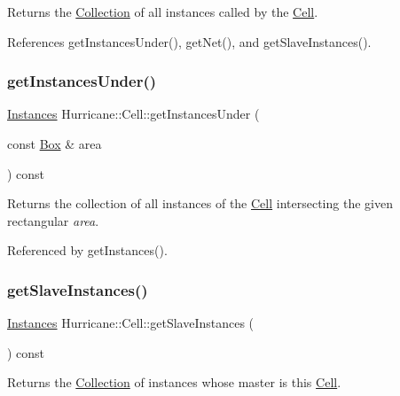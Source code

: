 Returns the \hyperlink{classHurricane_1_1Collection}{Collection} of all instances called by the \hyperlink{classHurricane_1_1Cell}{Cell}. 

References get\+Instances\+Under(), get\+Net(), and get\+Slave\+Instances().

\mbox{\label{classHurricane_1_1Cell_a5eb16d9d0f340ad71b81d794f6f8525f}} 
\subsubsection{\texorpdfstring{get\+Instances\+Under()}{getInstancesUnder()}}
{\footnotesize\ttfamily \hyperlink{namespaceHurricane_ac9436b03a2926f34ad6863deae2baadc}{Instances} Hurricane\+::\+Cell\+::get\+Instances\+Under (\begin{DoxyParamCaption}\item[{const \hyperlink{classHurricane_1_1Box}{Box} \&}]{area }\end{DoxyParamCaption}) const}

Returns the collection of all instances of the \hyperlink{classHurricane_1_1Cell}{Cell} intersecting the given rectangular {\itshape area}. 

Referenced by get\+Instances().

\mbox{\label{classHurricane_1_1Cell_a7e51bee5db73dd44f788e591a5c175c8}} 
\subsubsection{\texorpdfstring{get\+Slave\+Instances()}{getSlaveInstances()}}
{\footnotesize\ttfamily \hyperlink{namespaceHurricane_ac9436b03a2926f34ad6863deae2baadc}{Instances} Hurricane\+::\+Cell\+::get\+Slave\+Instances (\begin{DoxyParamCaption}{ }\end{DoxyParamCaption}) const}

Returns the \hyperlink{classHurricane_1_1Collection}{Collection} of instances whose master is this \hyperlink{classHurricane_1_1Cell}{Cell}. 

